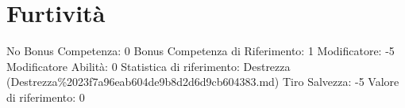 \section{Furtività}\label{furtivituxe0}

\begin{description}
\tightlist
\item[Tags: ABI]
No Bonus Competenza: 0 Bonus Competenza di Riferimento: 1 Modificatore:
-5 Modificatore Abilità: 0 Statistica di riferimento: Destrezza
(Destrezza\%2023f7a96eab604de9b8d2d6d9cb604383.md) Tiro Salvezza: -5
Valore di riferimento: 0
\end{description}
